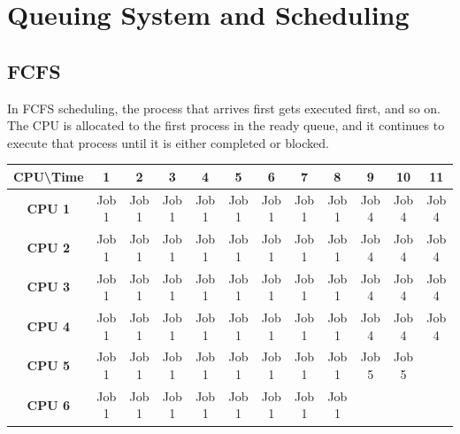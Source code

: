 \documentclass[11pt]{article}
\begin{document}
\newpage

\hypertarget{2}{%
\section{Queuing System and Scheduling}\label{2}}

\hypertarget{FCFS}{%
\subsection{FCFS}\label{FCFS}}

In FCFS scheduling, the process that arrives first gets executed first, and so on. The CPU is allocated to the first process in the ready queue, and it continues to execute that process until it is either completed or blocked.

\begin{table}[]
\centering
\begin{tabular}{|c|c|c|c|c|c|c|c|c|c|c|c|}
\hline
\textbf{CPU\textbackslash{}Time} & \textbf{1} & \textbf{2} & \textbf{3} & \textbf{4} & \textbf{5} & \textbf{6} & \textbf{7} & \textbf{8} & \textbf{9}     & \textbf{10} & \textbf{11} \\ \hline
\textbf{CPU 1}                   & Job 1      & Job 1      & Job 1      & Job 1      & Job 1      & Job 1      & Job 1      & Job 1      & Job 4          & Job 4       & Job 4       \\ \hline
\textbf{CPU 2}                   & Job 1      & Job 1      & Job 1      & Job 1      & Job 1      & Job 1      & Job 1      & Job 1      & Job 4 & Job 4       & Job 4       \\ \hline
\textbf{CPU 3}                   & Job 1      & Job 1      & Job 1      & Job 1      & Job 1      & Job 1      & Job 1      & Job 1      & Job 4          & Job 4       & Job 4       \\ \hline
\textbf{CPU 4}                   & Job 1      & Job 1      & Job 1      & Job 1      & Job 1      & Job 1      & Job 1      & Job 1      & Job 4          & Job 4       & Job 4       \\ \hline
\textbf{CPU 5}                   & Job 1      & Job 1      & Job 1      & Job 1      & Job 1      & Job 1      & Job 1      & Job 1      & Job 5          & Job 5       &             \\ \hline
\textbf{CPU 6}                   & Job 1      & Job 1      & Job 1      & Job 1      & Job 1      & Job 1      & Job 1      & Job 1      &                &             &             \\ \hline

\end{tabular}
\end{table}
\end{document}
